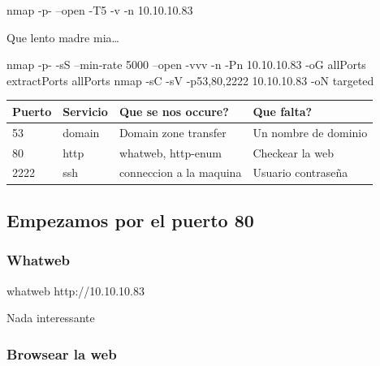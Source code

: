 \documentclass{assets/ipesethesis}
\newenvironment{Shaded}{\begin{snugshade}}{\end{snugshade}}
\newcommand{\ExtensionTok}[1]{#1}
\newcommand{\FunctionTok}[1]{\textcolor[rgb]{0.00,0.00,0.00}{#1}}
\newcommand{\NormalTok}[1]{#1}
\begin{document}
\begin{Shaded}
\begin{Highlighting}[]
\FunctionTok{nmap}\NormalTok{ -p- --open -T5 -v -n 10.10.10.83}
\end{Highlighting}
\end{Shaded}

Que lento madre mia\ldots{}

\begin{Shaded}
\begin{Highlighting}[]
\FunctionTok{nmap}\NormalTok{ -p- -sS --min-rate 5000 --open -vvv -n -Pn 10.10.10.83 -oG allPorts}
\ExtensionTok{extractPorts}\NormalTok{ allPorts}
\FunctionTok{nmap}\NormalTok{ -sC -sV -p53,80,2222 10.10.10.83 -oN targeted}
\end{Highlighting}
\end{Shaded}

\begin{longtable}[]{@{}llll@{}}
\toprule
Puerto & Servicio & Que se nos occure? & Que falta?\tabularnewline
\midrule
\endhead
53 & domain & Domain zone transfer & Un nombre de dominio\tabularnewline
80 & http & whatweb, http-enum & Checkear la web\tabularnewline
2222 & ssh & conneccion a la maquina & Usuario contraseña\tabularnewline
\bottomrule
\end{longtable}

\hypertarget{empezamos-por-el-puerto-80}{%
\subsection*{Empezamos por el puerto 80}\label{empezamos-por-el-puerto-80}}

\hypertarget{whatweb}{%
\subsubsection*{Whatweb}\label{whatweb}}

\begin{Shaded}
\begin{Highlighting}[]
\ExtensionTok{whatweb}\NormalTok{ http://10.10.10.83}
\end{Highlighting}
\end{Shaded}

Nada interessante

\hypertarget{browsear-la-web}{%
\subsubsection*{Browsear la web}\label{browsear-la-web}}
\end{document}
